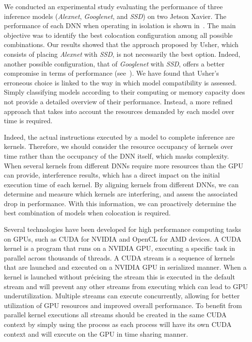 We conducted an experimental study evaluating the performance of three inference models (\textit{Alexnet}, \textit{Googlenet}, and \textit{SSD}) on two Jetson Xavier. The performance of each DNN when operating in isolation is shown in~. The main objective was to identify the best colocation configuration among all possible combinations. Our results showed that the approach proposed by Usher, which consists of placing \textit{Alexnet} with \textit{SSD}, is not necessarily the best option. Indeed, another possible configuration, that of \textit{Googlenet} with \textit{SSD}, offers a better compromise in terms of performance (see~).
We have found that Usher's erroneous choice is linked to the way in which model compatibility is assessed. Simply classifying models according to their computing or memory capacity does not provide a detailed overview of their performance. Instead, a more refined approach that takes into account the resources demanded by each model over time is required.

Indeed, the actual instructions executed by a model to complete inference are kernels. Therefore, we should consider the resource occupancy of kernels over time rather than the occupancy of the DNN itself, which masks complexity. When several kernels from different DNNs require more resources than the GPU can provide, interference results, which has a direct impact on the initial execution time of each kernel.
By aligning kernels from different DNNs, we can determine and measure which kernels are interfering, and assess the associated drop in performance. With this information, we can proactively determine the best combination of models when colocation is required.

Several technologies have been developed for high performance computing tasks on GPUs, such as CUDA for NVIDIA and OpenCL for AMD devices. A CUDA kernel is a program that runs on a NVIDIA GPU, executing a specific task in parallel across thousands of threads. A CUDA stream is a sequence of kernels that are launched and executed on a NVIDIA GPU in serialized manner. When a kernel is launched without précising the stream this is executed in the default stream and will prevent any other streams from executing which can lead to GPU underutilization. Multiple streams can execute concurrently, allowing for better utilization of GPU resources and improved overall performance. To benefit from parallel kernel executions all streams should be created in the same CUDA context by simply using the process as each process will have its own CUDA context and will execute on the GPU in time sharing manner.

